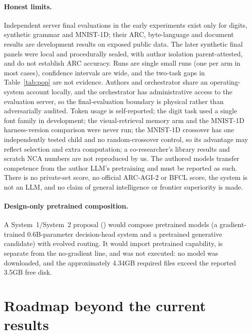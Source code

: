 \documentclass[11pt]{article}
\begin{document}
\paragraph{Honest limits.} Independent server final evaluations in the early experiments exist only
for digits, synthetic grammar and MNIST-1D; their ARC, byte-language and document results are
development results on exposed public data. The later synthetic final panels were local and
procedurally sealed, with author isolation parent-attested, and do not establish ARC accuracy.
Runs are single small runs (one per arm in most cases), confidence intervals are wide, and the two-task
gaps in Table~\ref{tab:pop} are not evidence. Authors and orchestrator share an operating-system account
locally, and the orchestrator has administrative access to the evaluation server, so the final-evaluation
boundary is physical rather than adversarially audited. Token usage is self-reported; the digit task used a
single font family in development; the visual-retrieval memory arm and the MNIST-1D harness-version
comparison were never run; the MNIST-1D crossover has one independently tested child and no random-crossover
control, so its advantage may reflect selection and extra computation; a co-researcher's library results
and scratch NCA numbers are not reproduced by us. The authored models transfer competence from the author
LLM's pretraining and must be reported as such. There is no private-set score, no official ARC-AGI-2 or
BFCL score, the system is not an LLM, and no claim of general intelligence or frontier superiority is made.

\paragraph{Design-only pretrained composition.} A System~1/System~2 proposal
() would compose pretrained models (a gradient-trained 0.6B-parameter
decision-head system and a pretrained generative candidate) with evolved routing. It would import
pretrained capability, is separate from the no-gradient line, and was not executed: no model was
downloaded, and the approximately 4.34GB required files exceed the reported 3.5GB free disk.

\section{Roadmap beyond the current results}\label{sec:roadmap}
\end{document}
